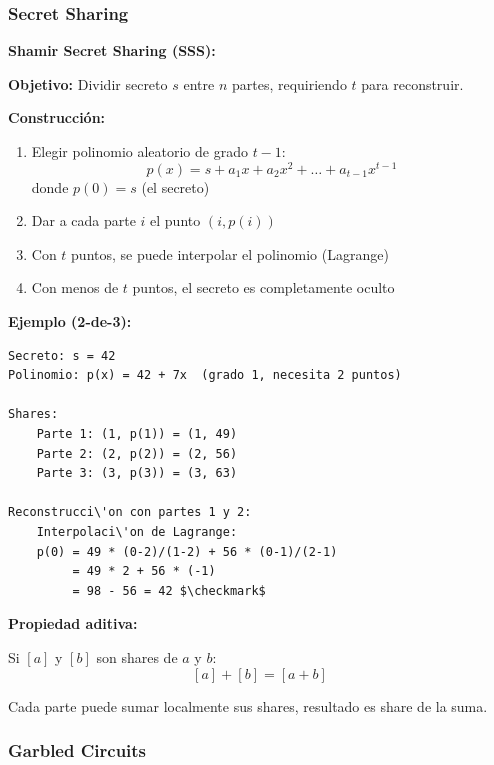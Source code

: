 \documentclass[11pt,a4paper,twoside]{book}
\begin{document}
\subsubsection{Secret Sharing}

\begin{mathnote}
\textbf{Shamir Secret Sharing (SSS):}

\textbf{Objetivo:} Dividir secreto $s$ entre $n$ partes, requiriendo $t$ para reconstruir.

\textbf{Construcci\'on:}
\begin{enumerate}
    \item Elegir polinomio aleatorio de grado $t-1$:
    \[ p(x) = s + a_1 x + a_2 x^2 + \ldots + a_{t-1} x^{t-1} \]
    donde $p(0) = s$ (el secreto)
    
    \item Dar a cada parte $i$ el punto $(i, p(i))$
    
    \item Con $t$ puntos, se puede interpolar el polinomio (Lagrange)
    
    \item Con menos de $t$ puntos, el secreto es completamente oculto
\end{enumerate}

\textbf{Ejemplo (2-de-3):}
\begin{verbatim}
Secreto: s = 42
Polinomio: p(x) = 42 + 7x  (grado 1, necesita 2 puntos)

Shares:
    Parte 1: (1, p(1)) = (1, 49)
    Parte 2: (2, p(2)) = (2, 56)
    Parte 3: (3, p(3)) = (3, 63)

Reconstrucci\'on con partes 1 y 2:
    Interpolaci\'on de Lagrange:
    p(0) = 49 * (0-2)/(1-2) + 56 * (0-1)/(2-1)
         = 49 * 2 + 56 * (-1)
         = 98 - 56 = 42 $\checkmark$
\end{verbatim}

\textbf{Propiedad aditiva:}

Si $[a]$ y $[b]$ son shares de $a$ y $b$:
\[ [a] + [b] = [a + b] \]

Cada parte puede sumar localmente sus shares, resultado es share de la suma.
\end{mathnote}

\subsubsection{Garbled Circuits}
\end{document}
